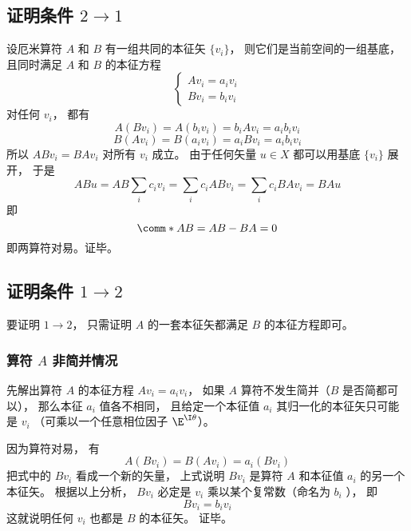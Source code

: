 \subsection{证明条件 $2 \to 1$}
设厄米算符 $A$ 和 $B$ 有一组共同的本征矢 $\{v_i\}$， 则它们是当前空间的一组基底， 且同时满足 $A$ 和 $B$ 的本征方程
\begin{equation}
\begin{cases}
A v_i = a_i v_i\\
B v_i = b_i v_i
\end{cases}
\end{equation}
对任何 $v_i$，  都有
\begin{equation}
A (B v_i) = A (b_i v_i) = b_iA v_i = a_i b_i v_i
\end{equation}
\begin{equation}
B (A v_i) = B (a_i v_i) = a_i B v_i = a_i b_i v_i
\end{equation}
所以 $AB v_i = BA v_i$ 对所有 $v_i$ 成立。 由于任何矢量 $u \in X$ 都可以用基底 $\{v_i\}$ 展开， 于是
\begin{equation}
AB u = AB \sum_i c_i v_i = \sum_i c_i  AB v_i = \sum_i c_i BA v_i = BA u
\end{equation}
即
\begin{equation}
\comm*{A}{B} = AB - BA = 0
\end{equation}
即两算符对易。证毕。

\subsection{证明条件 $1 \to 2$}

要证明 $1 \to 2$，  只需证明 $A$ 的一套本征矢都满足 $B$ 的本征方程即可。

\subsubsection{算符 $A$ 非简并情况}

先解出算符 $A$ 的本征方程 $A v_i = a_i v_i$，  如果 $A$ 算符不发生简并（$B$ 是否简都可以）， 那么本征 $a_i$ 值各不相同， 且给定一个本征值 $a_i$ 其归一化的本征矢只可能是 $v_i$ （可乘以一个任意相位因子 $\E^{\I\theta}$）。

因为算符对易， 有
\begin{equation}
A (B v_i) = B (A v_i) = a_i (B v_i)
\end{equation}
把式中的 $B v_i$ 看成一个新的矢量， 上式说明 $B v_i$ 是算符 $A$ 和本征值 $a_i$ 的另一个本征矢。 根据以上分析， $B v_i$ 必定是 $v_i$ 乘以某个复常数（命名为 $b_i$ ）， 即
\begin{equation}
B v_i = b_i v_i
\end{equation}
这就说明任何 $v_i$ 也都是 $B$ 的本征矢。 证毕。

